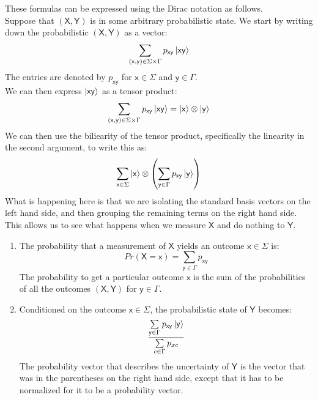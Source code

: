 \raggedright
These formulas can be expressed using the Dirac notation as follows. \\[1em]
Suppose that $(\mathsf{X},\mathsf{Y})$ is in some arbitrary probabilistic state. We start by writing down the probabilistic $(\mathsf{X},\mathsf{Y})$ as a vector:
\begin{equation*}
    \sum\limits_{(\mathsf{x},\mathsf{y})\in\Sigma\times\Gamma}p_{\mathsf{xy}}\ket{\mathsf{xy}}
\end{equation*}
The entries are denoted by $p_{\mathsf{xy}}$ for $\mathsf{x}\in\Sigma$ and $\mathsf{y}\in\Gamma$.\\[1em]
We can then express $\ket{\mathsf{xy}}$ as a tensor product:
\begin{equation*}
    \sum\limits_{(\mathsf{x},\mathsf{y})\in\Sigma\times\Gamma}p_{\mathsf{xy}}\ket{\mathsf{xy}}=\ket{\mathsf{x}}\otimes\ket{\mathsf{y}}
\end{equation*}
We can then use the biliearity of the tensor product, specifically the linearity in the second argument, to write this as:
\begin{equation*}
    \sum\limits_{\mathsf{x}\in\Sigma}\ket{\mathsf{x}}\otimes\left(\sum\limits_{\mathsf{y}\in\Gamma}p_{\mathsf{xy}}\ket{\mathsf{y}}\right)
\end{equation*}
What is happening here is that we are isolating the standard basis vectors on the left hand side, and then grouping the remaining terms on the right hand side. This allows us to see what happens when we measure $\mathsf{X}$ and do nothing to $\mathsf{Y}$.
\begin{enumerate}
    \item The probability that a measurement of $\mathsf{X}$ yields an outcome $\mathsf{x}\in\Sigma$ is:
    \begin{equation*}
        Pr(\mathsf{X}=\mathsf{x})=\sum\limits_{\mathsf{y}\in\Gamma}p_{\mathsf{xy}}
    \end{equation*}
    The probability to get a particular outcome $\mathsf{x}$ is the sum of the probabilities of all the outcomes $(\mathsf{X},\mathsf{Y})$ for $\mathsf{y}\in\Gamma$.
    \item Conditioned on the outcome $\mathsf{x}\in\Sigma$, the probabilistic state of $\mathsf{Y}$ becomes:
    \begin{equation*}
        \dfrac{\sum\limits_{\mathsf{y}\in\Gamma}p_{\mathsf{xy}}\ket{\mathsf{y}}}{\sum\limits_{c\in\Gamma}p_{xc}}
    \end{equation*}
    The probability vector that describes the uncertainty of $\mathsf{Y}$ is the vector that was in the parentheses on the right hand side, except that it has to be normalized for it to be a probability vector.
\end{enumerate}


